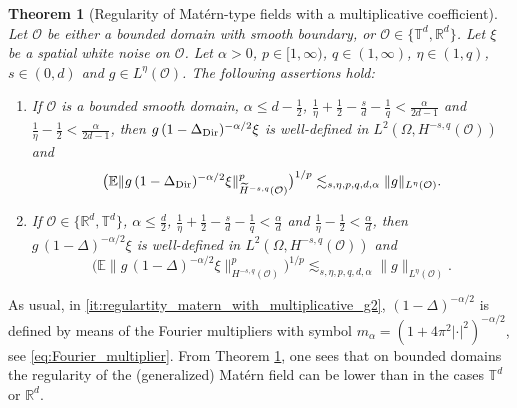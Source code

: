 \documentclass[reqno]{amsart}
\theoremstyle{plain}
\newtheorem{theorem}{Theorem}[section]
\theoremstyle{remark}
\theoremstyle{plain}
\numberwithin{equation}{section}
\newcommand\cO{\mathcal{O}}
\def\R{{\mathbb R}}
\newcommand{\E}{{\mathbb E}}
\renewcommand{\O}{\Omega}
\newcommand{\T}{\mathbb{T}}
\newcommand{\wt}{\widetilde}
\newcommand{\1}{\one}
\begin{document}
\begin{theorem}[Regularity of Matérn-type fields with a multiplicative coefficient]
\label{thm:regulartity_matern_with_multiplicative_g}
Let $\cO$ be either a bounded domain with smooth boundary, or $\cO\in \{\T^d,\R^d\}$. Let $\xi$ be a spatial white noise on $\cO$. Let $\alpha> 0$, $p\in [1, \infty)$, $q\in (1, \infty)$,  $\eta\in (1, q)$, $s\in (0,d)$ and $g\in L^\eta(\cO)$. The following assertions hold:
\begin{enumerate}[{\rm(1)}]
\item\label{it:regulartity_matern_with_multiplicative_g1} If $\cO$ is a bounded smooth domain, $\alpha\leq d-\frac12$, $\frac{1}{\eta} + \frac{1}{2} -\frac{s}{d} - \frac{1}{q}  <\frac{\alpha}{2d-1}$ and $\frac{1}{\eta} - \frac12<\frac{\alpha}{2d-1}$, then $g\,(1-\Delta_{{\rm Dir}})^{-\alpha/2} \xi$ is well-defined in $L^2(\O,H^{-s,q}(\cO))$ and 
$$
    \big(\E \|g \,(1-\Delta_{{\rm Dir}})^{-\alpha/2}\xi \|_{\wt{H}^{-s,q}(\mathcal{O})}^p\big)^{1/p} \lesssim_{s,\eta,p,q,d,\alpha}  \|g\|_{L^\eta(\mathcal{O})}.
$$
\item\label{it:regulartity_matern_with_multiplicative_g2} If $\cO\in \{\R^d,\T^d\}$, $\alpha\leq \frac{d}{2}$, $\frac{1}{\eta} + \frac{1}{2} -\frac{s}{d} - \frac{1}{q}  <\frac{\alpha}{d}$
and $\frac{1}{\eta} - \frac12<\frac{\alpha}{d}$, then 
$g\,(1-\Delta)^{-\alpha/2} \xi$ is well-defined in $L^2(\O,H^{-s,q}(\cO))$ and 
$$
    \big(\E \|g\, (1-\Delta)^{-\alpha/2}\xi \|_{H^{-s,q}(\mathcal{O})}^p\big)^{1/p} \lesssim_{s,\eta,p,q,d,\alpha}  \|g\|_{L^\eta(\mathcal{O})}.
$$
\end{enumerate}
\end{theorem}

As usual, in \eqref{it:regulartity_matern_with_multiplicative_g2}, $(1-\Delta)^{-\alpha/2}$ is defined by means of the Fourier multipliers with symbol $m_\alpha=(1+4\pi^2|\cdot|^2)^{-\alpha/2}$, see \eqref{eq:Fourier_multiplier}.
%
%
From Theorem \ref{thm:regulartity_matern_with_multiplicative_g}, one sees that on bounded domains the regularity of the (generalized) Mat\'ern field can be lower than in the cases $\T^d$ or $\R^d$. 
\end{document}
